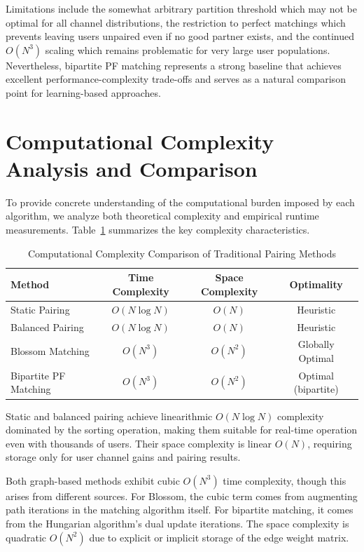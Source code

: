 Limitations include the somewhat arbitrary partition threshold which may not be optimal for all channel distributions, the restriction to perfect matchings which prevents leaving users unpaired even if no good partner exists, and the continued $O(N^3)$ scaling which remains problematic for very large user populations. Nevertheless, bipartite PF matching represents a strong baseline that achieves excellent performance-complexity trade-offs and serves as a natural comparison point for learning-based approaches.

\section{Computational Complexity Analysis and Comparison}

To provide concrete understanding of the computational burden imposed by each algorithm, we analyze both theoretical complexity and empirical runtime measurements. Table~\ref{tab:complexity_comparison} summarizes the key complexity characteristics.

\begin{table}[h]
\centering
\caption{Computational Complexity Comparison of Traditional Pairing Methods}
\label{tab:complexity_comparison}
\begin{tabular}{lccc}
\toprule
\textbf{Method} & \textbf{Time Complexity} & \textbf{Space Complexity} & \textbf{Optimality} \\
\midrule
Static Pairing & $O(N \log N)$ & $O(N)$ & Heuristic \\
Balanced Pairing & $O(N \log N)$ & $O(N)$ & Heuristic \\
Blossom Matching & $O(N^3)$ & $O(N^2)$ & Globally Optimal \\
Bipartite PF Matching & $O(N^3)$ & $O(N^2)$ & Optimal (bipartite) \\
\bottomrule
\end{tabular}
\end{table}

Static and balanced pairing achieve linearithmic $O(N \log N)$ complexity dominated by the sorting operation, making them suitable for real-time operation even with thousands of users. Their space complexity is linear $O(N)$, requiring storage only for user channel gains and pairing results.

Both graph-based methods exhibit cubic $O(N^3)$ time complexity, though this arises from different sources. For Blossom, the cubic term comes from augmenting path iterations in the matching algorithm itself. For bipartite matching, it comes from the Hungarian algorithm's dual update iterations. The space complexity is quadratic $O(N^2)$ due to explicit or implicit storage of the edge weight matrix.

